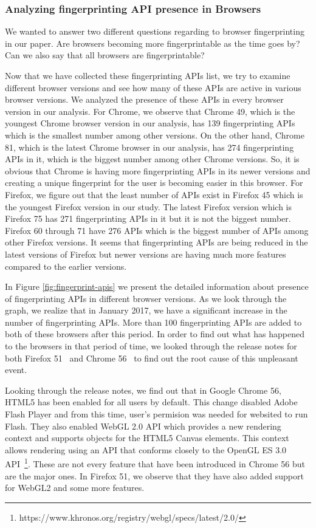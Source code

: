 



\subsubsection{Analyzing fingerprinting API presence in Browsers}
We wanted to answer two different questions regarding to browser fingerprinting in our paper. Are browsers becoming more fingerprintable as the time goes by? Can we also say that all browsers are fingerprintable?

Now that we have collected these fingerprinting APIs list, we try to examine different browser versions and see how many of these APIs are active in various browser versions.
We analyzed the presence of these APIs in every browser version in our analysis. For Chrome, we observe that Chrome 49, which is the youngest Chrome browser version in our analysis, has 139 fingerprinting APIs which is the smallest number among other versions.
On the other hand, Chrome 81, which is the latest Chrome browser in our analysis, has 274 fingerprinting APIs in it, which is the biggest number among other Chrome versions. So, it is obvious that Chrome is having more fingerprinting APIs in its newer versions and creating a unique fingerprint for the user is becoming easier in this browser. 
For Firefox, we figure out that the least number of APIs exist in Firefox 45 which is the youngest Firefox version in our study. The latest Firefox version which is Firefox 75 has 271 fingerprinting APIs in it but it is not the biggest number. Firefox 60 through 71 have 276 APIs which is the biggest number of APIs among other Firefox versions. It seems that fingerprinting APIs are being reduced in the latest versions of Firefox but newer versions are having much more features compared to the earlier versions.

In Figure \ref{fig:fingerprint-apis} we present the detailed information about presence of fingerprinting APIs in different browser versions. As we look through the graph, we realize that in January 2017, we have a significant increase in the number of fingerprinting APIs. More than 100 fingerprinting APIs are added to both of these browsers after this period. In order to find out what has happened to the browsers in that period of time, we looked through the release notes for both Firefox 51~\cite{firefox-51-notes} and Chrome 56~\cite{chrome-56-notes} to find out the root cause of this unpleasant event. 

Looking through the release notes, we find out that in Google Chrome 56, HTML5 has been enabled for all users by default. This change disabled Adobe Flash Player and from this time, user's permision was needed for websited to run Flash. They also enabled WebGL 2.0 API which provides a new rendering context and supports objects for the HTML5 Canvas elements. This context allows rendering using an API that conforms closely to the OpenGL ES 3.0 API~\footnote{https://www.khronos.org/registry/webgl/specs/latest/2.0/}. These are not every feature that have been introduced in Chrome 56 but are the major ones. In Firefox 51, we observe that they have also added support for WebGL2 and some more features.

